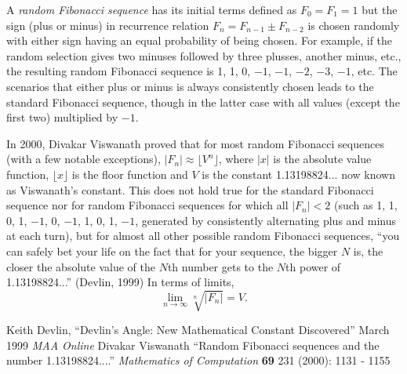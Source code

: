 \documentclass[12pt]{article}
\begin{document}
A {\em random Fibonacci sequence} has its initial terms defined as $F_0 = F_1 = 1$ but the sign (plus or minus) in recurrence relation $F_n = F_{n - 1} \pm F_{n - 2}$ is chosen randomly with either sign having an equal probability of being chosen. For example, if the random selection gives two minuses followed by three plusses, another minus, etc., the resulting random Fibonacci sequence is 1, 1, 0, $-1$, $-1$, $-2$, $-3$, $-1$, etc. The scenarios that either plus or minus is always consistently chosen leads to the standard Fibonacci sequence, though in the latter case with all values (except the first two) multiplied by $-1$. 

In 2000, Divakar Viswanath proved that for most random Fibonacci sequences (with a few notable exceptions), $|F_n| \approx \lfloor V^n \rfloor$, where $|x|$ is the absolute value function, $\lfloor x \rfloor$ is the floor function and $V$ is the constant 1.13198824... now known as Viswanath's constant. This does not hold true for the standard Fibonacci sequence nor for random Fibonacci sequences for which all $|F_n| < 2$ (such as 1, 1, 0, 1, $-1$, 0, $-1$, 1, 0, 1, $-1$, generated by consistently alternating plus and minus at each turn), but for almost all other possible random Fibonacci sequences, ``you can safely bet your life on the fact that for your sequence, the bigger $N$ is, the closer the absolute value of the $N$th number gets to the $N$th power of 1.13198824...'' (Devlin, 1999) In terms of limits, $$\lim_{n \to \infty} \sqrt[n]{|F_n|} = V.$$

\begin{thebibliography}{2}
 Keith Devlin, ``Devlin's Angle: New Mathematical Constant Discovered'' March 1999 {\it MAA Online}
 Divakar Viswanath ``Random Fibonacci sequences and the number 1.13198824....'' {\it Mathematics of Computation} {\bf 69} 231 (2000): 1131 - 1155
\end{thebibliography}

\end{document}
